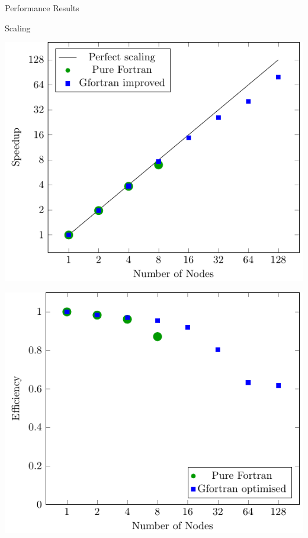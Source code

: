\documentclass{beamer}
\begin{document}
\begin{frame}{Performance Results}
\centering
 
\end{frame}

\begin{frame}{Scaling}
\centering
\hspace{-.08\textwidth}
\begin{minipage}{.45\textwidth}
 \includegraphics[width=1.1\textwidth]{Scaling/Speedup.pdf}
\end{minipage}
\hspace{.1\textwidth}
\begin{minipage}{.45\textwidth}
 \includegraphics[width=1.1\textwidth]{Scaling/Efficiency.pdf}
\end{minipage}
\end{frame}
\end{document}
